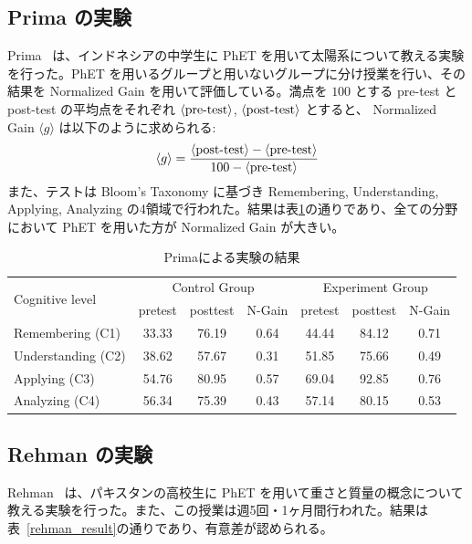 \subsection*{Prima の実験}

Prima~\cite{prima_learning_2018} は、インドネシアの中学生に PhET を用いて太陽系について教える実験を行った。PhET を用いるグループと用いないグループに分け授業を行い、その結果を Normalized Gain を用いて評価している。満点を $100$ とする pre-test と post-test の平均点をそれぞれ $\langle \textrm{pre\\-test} \rangle$, $\langle \textrm{post\\-test} \rangle$ とすると、 Normalized Gain $\langle g \rangle$ は以下のように求められる:
$$ \langle g \rangle = \dfrac{\langle \textrm{post\\-test} \rangle - \langle \textrm{pre\\-test} \rangle}{100 - \langle \textrm{pre\\-test} \rangle} $$
また、テストは Bloom's Taxonomy に基づき Remembering, Understanding, Applying, Analyzing の4領域で行われた。結果は表\ref{prima_table}の通りであり、全ての分野において PhET を用いた方が Normalized Gain が大きい。

\begin{table}[htb]
\centering
\begin{tabular}{lcccccc}
  \toprule
  \multirow{2}{*}{Cognitive level} & \multicolumn{3}{c}{Control Group} & \multicolumn{3}{c}{Experiment Group}\\
  \cmidrule(lr){2-4} \cmidrule(lr){5-7}
  & pretest & posttest & N-Gain & pretest & posttest & N-Gain\\
  \midrule
  Remembering (C1) & 33.33 & 76.19 & 0.64 & 44.44 & 84.12 & 0.71\\
  Understanding (C2) & 38.62 & 57.67 & 0.31 & 51.85 & 75.66 & 0.49\\
  Applying (C3) & 54.76 & 80.95 & 0.57 & 69.04 & 92.85 & 0.76\\
  Analyzing (C4) & 56.34 & 75.39 & 0.43 & 57.14 & 80.15 & 0.53\\
  \bottomrule
\end{tabular}

\caption{Primaによる実験の結果}
\label{prima_table}
\end{table}

\subsection*{Rehman の実験}
Rehman~\cite{rehman_teaching_2021} は、パキスタンの高校生に PhET を用いて重さと質量の概念について教える実験を行った。また、この授業は週5回・1ヶ月間行われた。結果は表~\ref{rehman_result}の通りであり、有意差が認められる。

